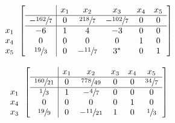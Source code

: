 \documentclass[12pt]{article}
\newenvironment{problem}[2][Problem]{\begin{trivlist}
\item[\hskip \labelsep {\bfseries #1}\hskip \labelsep {\bfseries #2.}]}{\end{trivlist}}
\theoremstyle{definition}
\begin{document}
\begin{problem}{4}
\begin{equation}
\begin{array}{c}
\\
  \\
x_1 \\
x_4 \\
x_5
\end{array}
\begin{bmatrix} %
\begin{array}{c|ccccc}
    & x_1 & x_2 & x_3 & x_4 & x_5 \\ \hline
  -\sfrac{162}{7} & 0 & \sfrac{218}{7} & -\sfrac{102}{7} & 0 & 0 \\ \hline
  -6 & 1 & 4 & -3 & 0 & 0  \\
  0 & 0 & 0 & 0 & 1 & 0  \\
  \sfrac{19}{3} & 0 & -\sfrac{11}{7} & 3^* & 0 & 1  \\
\end{array}
\end{bmatrix}
\end{equation}
$ $ \\

\begin{equation}
\begin{array}{c}
\\
  \\
x_1 \\
x_4 \\
x_3
\end{array}
\begin{bmatrix} %
\begin{array}{c|ccccc}
    & x_1 & x_2 & x_3 & x_4 & x_5 \\ \hline
  \sfrac{160}{21} & 0 & \sfrac{778}{49} & 0 & 0 & \sfrac{34}{7} \\ \hline
  \sfrac{1}{3} & 1 & -\sfrac{4}{7} & 0 & 0 & 0  \\
  0 & 0 & 0 & 0 & 1 & 0  \\
  \sfrac{19}{9} & 0 & -\sfrac{11}{21} & 1 & 0 & \sfrac{1}{3}  \\
\end{array}
\end{bmatrix}
\end{equation}
$ $ \\

\end{problem}
\end{document}
